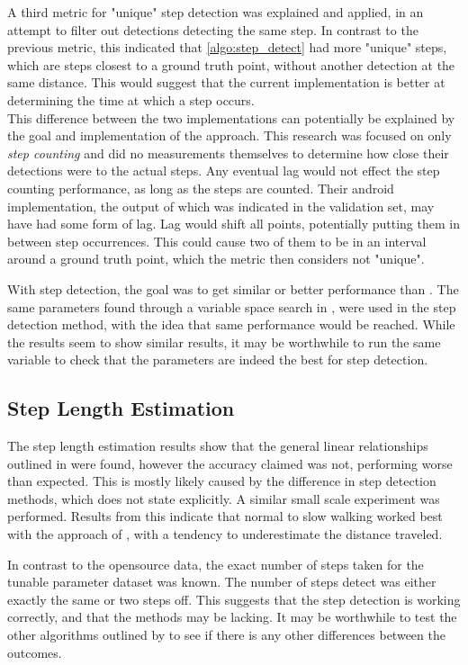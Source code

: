 A third metric for "unique" step detection was explained and applied, in an attempt to filter out detections detecting the same step. In contrast to the previous metric, this indicated that \cref{algo:step_detect} had more "unique" steps, which are steps closest to a ground truth point, without another detection at the same distance. This would suggest that the current implementation is better at determining the time at which a step occurs. \\
This difference between the two implementations can potentially be explained by the goal and implementation of the \citet{Salvi2018} approach. This research was focused on only \textit{step counting} and did no measurements themselves to determine how close their detections were to the actual steps. Any eventual lag would not effect the step counting performance, as long as the steps are counted. Their android implementation, the output of which was indicated in the validation set, may have had some form of lag. Lag would shift all points, potentially putting them in between step occurrences. This could cause two of them to be in an interval around a ground truth point, which the metric then considers not "unique". \par 

With step detection, the goal was to get similar or better performance than \cite{Salvi2018} . The same parameters found through a variable space search in \cite{Salvi2018}, were used in the step detection method, with the idea that same performance would be reached. While the results seem to show similar results, it may be worthwhile to run the same variable to check that the parameters are indeed the best for step detection.

\subsection*{Step Length Estimation}
The step length estimation results show that the general linear relationships outlined in \cite{Vezocnik2019} were found, however the accuracy claimed was not, performing worse than expected. This is mostly likely caused by the difference in step detection methods, which \cite{Vezocnik2019} does not state explicitly. A similar small scale experiment was performed. Results from this indicate that normal to slow walking worked best with the approach of \cite{Tian2016}, with a tendency to underestimate the distance traveled. \par 

In contrast to the opensource data, the exact number of steps taken for the tunable parameter dataset was known. The number of steps detect was either exactly the same or two steps off. This suggests that the step detection is working correctly, and that the methods may be lacking. It may be worthwhile to test the other algorithms outlined by \cite{Vezocnik2019} to see if there is any other differences between the outcomes. 

